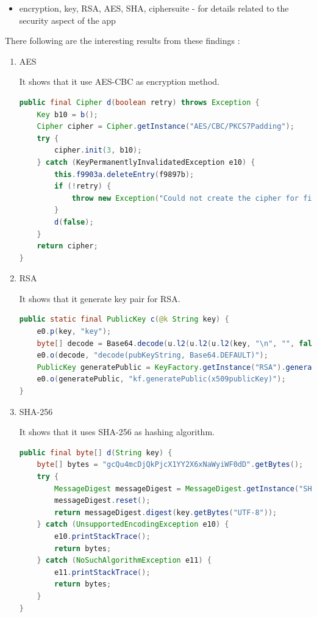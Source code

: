 \documentclass[11pt]{article}
\begin{document}
\begin{itemize}
    \item encryption, key, RSA, AES, SHA, ciphersuite - for details related to the security aspect of the app
\end{itemize}

There following are the interesting results from these findings :

\begin{enumerate}
    \item AES \par
    It shows that it use AES-CBC as encryption method.

          \begin{lstlisting}[language=Java, caption=com.ants360.yicamera.base.p.java]
public final Cipher d(boolean retry) throws Exception {
    Key b10 = b();
    Cipher cipher = Cipher.getInstance("AES/CBC/PKCS7Padding");
    try {
        cipher.init(3, b10);
    } catch (KeyPermanentlyInvalidatedException e10) {
        this.f9903a.deleteEntry(f9897b);
        if (!retry) {
            throw new Exception("Could not create the cipher for fingerprint authentication.", e10);
        }
        d(false);
    }
    return cipher;
}
\end{lstlisting}

    \item RSA \par
    It shows that it generate key pair for RSA.

          \begin{lstlisting}[language=Java, caption=v4.c.java]
public static final PublicKey c(@k String key) {
    e0.p(key, "key");
    byte[] decode = Base64.decode(u.l2(u.l2(u.l2(key, "\n", "", false, 4, null), "-----BEGIN PUBLIC KEY-----", "", false, 4, null), "-----END PUBLIC KEY-----", "", false, 4, null), 0);
    e0.o(decode, "decode(pubKeyString, Base64.DEFAULT)");
    PublicKey generatePublic = KeyFactory.getInstance("RSA").generatePublic(new X509EncodedKeySpec(decode));
    e0.o(generatePublic, "kf.generatePublic(x509publicKey)");
}
\end{lstlisting}

    \item SHA-256 \par
    It shows that it uses SHA-256 as hashing algorithm.

          \begin{lstlisting}[language=Java, caption=com.xiaoyi.base.util.y.java]
public final byte[] d(String key) {
    byte[] bytes = "gcQu4mcDjQkPjcX1YY2X6xNaWyiWF0dD".getBytes();
    try {
        MessageDigest messageDigest = MessageDigest.getInstance("SHA-256");
        messageDigest.reset();
        return messageDigest.digest(key.getBytes("UTF-8"));
    } catch (UnsupportedEncodingException e10) {
        e10.printStackTrace();
        return bytes;
    } catch (NoSuchAlgorithmException e11) {
        e11.printStackTrace();
        return bytes;
    }
}
\end{lstlisting}
\end{enumerate}
\end{document}
